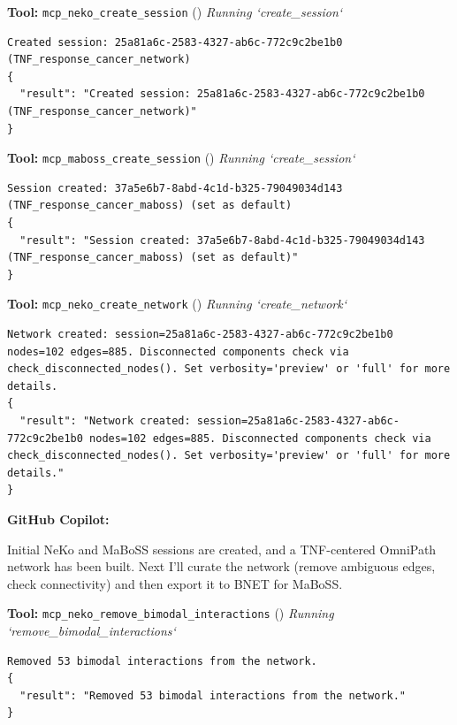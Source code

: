 \documentclass[11pt,a4paper]{article}
\begin{document}
\begin{toolokbox}
\textbf{Tool:} \texttt{mcp\_neko\_create\_session} (\checkmark)
\textit{Running `create\_session`}
\begin{lstlisting}
Created session: 25a81a6c-2583-4327-ab6c-772c9c2be1b0 (TNF_response_cancer_network)
{
  "result": "Created session: 25a81a6c-2583-4327-ab6c-772c9c2be1b0 (TNF_response_cancer_network)"
}
\end{lstlisting}
\end{toolokbox}
\begin{toolokbox}
\textbf{Tool:} \texttt{mcp\_maboss\_create\_session} (\checkmark)
\textit{Running `create\_session`}
\begin{lstlisting}
Session created: 37a5e6b7-8abd-4c1d-b325-79049034d143 (TNF_response_cancer_maboss) (set as default)
{
  "result": "Session created: 37a5e6b7-8abd-4c1d-b325-79049034d143 (TNF_response_cancer_maboss) (set as default)"
}
\end{lstlisting}
\end{toolokbox}
\begin{toolokbox}
\textbf{Tool:} \texttt{mcp\_neko\_create\_network} (\checkmark)
\textit{Running `create\_network`}
\begin{lstlisting}
Network created: session=25a81a6c-2583-4327-ab6c-772c9c2be1b0 nodes=102 edges=885. Disconnected components check via check_disconnected_nodes(). Set verbosity='preview' or 'full' for more details.
{
  "result": "Network created: session=25a81a6c-2583-4327-ab6c-772c9c2be1b0 nodes=102 edges=885. Disconnected components check via check_disconnected_nodes(). Set verbosity='preview' or 'full' for more details."
}
\end{lstlisting}
\end{toolokbox}
\begin{copilotbox}
\textbf{GitHub Copilot:}

Initial NeKo and MaBoSS sessions are created, and a TNF-centered OmniPath network has been built. Next I’ll curate the network (remove ambiguous edges, check connectivity) and then export it to BNET for MaBoSS.

\end{copilotbox}
\begin{toolokbox}
\textbf{Tool:} \texttt{mcp\_neko\_remove\_bimodal\_interactions} (\checkmark)
\textit{Running `remove\_bimodal\_interactions`}
\begin{lstlisting}
Removed 53 bimodal interactions from the network.
{
  "result": "Removed 53 bimodal interactions from the network."
}
\end{lstlisting}
\end{toolokbox}
\end{document}
